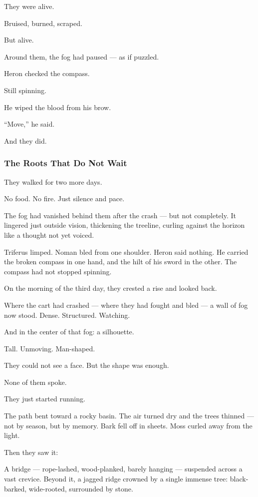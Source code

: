 \documentclass[12pt]{article}
\begin{document}
They were alive.

Bruised, burned, scraped.

But alive.

Around them, the fog had paused — as if puzzled.

Heron checked the compass.

Still spinning.

He wiped the blood from his brow.

“Move,” he said.

And they did.

\dotfill

\subsubsection{The Roots That Do Not Wait}

They walked for two more days.

No food. No fire. Just silence and pace.

The fog had vanished behind them after the crash — but not completely. It lingered just outside vision, thickening the treeline, curling against the horizon like a thought not yet voiced.

Triferus limped. Noman bled from one shoulder. Heron said nothing. He carried the broken compass in one hand, and the hilt of his sword in the other. The compass had not stopped spinning.

\bigskip

On the morning of the third day, they crested a rise and looked back.

Where the cart had crashed — where they had fought and bled — a wall of fog now stood. Dense. Structured. Watching.

And in the center of that fog: a silhouette.

Tall. Unmoving. Man-shaped.

They could not see a face. But the shape was enough.

None of them spoke.

They just started running.

\bigskip

The path bent toward a rocky basin. The air turned dry and the trees thinned — not by season, but by memory. Bark fell off in sheets. Moss curled away from the light.

Then they saw it:

A bridge — rope-lashed, wood-planked, barely hanging — suspended across a vast crevice. Beyond it, a jagged ridge crowned by a single immense tree: black-barked, wide-rooted, surrounded by stone.
\end{document}
